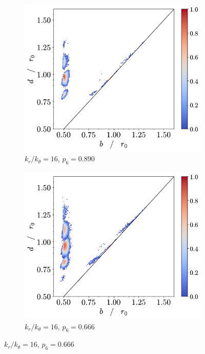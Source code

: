\begin{figure}[tbp]
	\centering
     
      \begin{subfigure}[b]{0.40\textwidth}
         \centering
         \includegraphics[width=\textwidth]{./figures/ph/t_k16_399_bs_pd.pdf}
         \caption{$k_r/k_\theta=16$, $p_6=0.890$} %
         \label{fig:bspda}
     \end{subfigure}
     \hspace{1cm}
        \begin{subfigure}[b]{0.40\textwidth}
         \centering
         \includegraphics[width=\textwidth]{./figures/ph/t_k16_301_bs_pd.pdf}
         \caption{$k_r/k_\theta=16$, $p_6=0.666$}%
         \label{fig:bspdb}
     \end{subfigure}
     

\end{figure}
